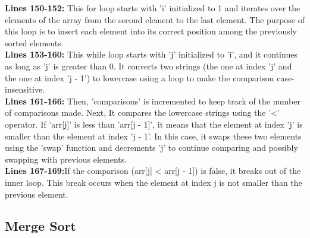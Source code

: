 \documentclass[letterpaper, 10pt,DIV=13]{scrartcl}
\numberwithin{equation}{section} %
\numberwithin{figure}{section} %
\numberwithin{table}{section} %
\begin{document}
\textbf{Lines 150-152:} This for loop starts with 'i' initialized to 1 and iterates over the elements of the array from the second element to the last element. The purpose of this loop is to insert each element into its correct position among the previously sorted elements. \\
\textbf{Lines 153-160:} This while loop starts with 'j' initialized to 'i', and it continues as long as 'j' is greater than 0. It converts two strings (the one at index 'j' and the one at index 'j - 1') to lowercase using a loop to make the comparison case-insensitive. \\
\textbf{Lines 161-166:} Then, 'comparisons' is incremented to keep track of the number of comparisons made. Next, It compares the lowercase strings using the '<' operator. If 'arr[j]' is less than 'arr[j - 1]', it means that the element at index 'j' is smaller than the element at index 'j - 1'. In this case, it swaps these two elements using the 'swap' function and decrements 'j' to continue comparing and possibly swapping with previous elements. \\
\textbf{Lines 167-169:}If the comparison (arr[j] < arr[j - 1]) is false, it breaks out of the inner loop. This break occurs when the element at index j is not smaller than the previous element.

\subsection{Merge Sort}
\end{document}
